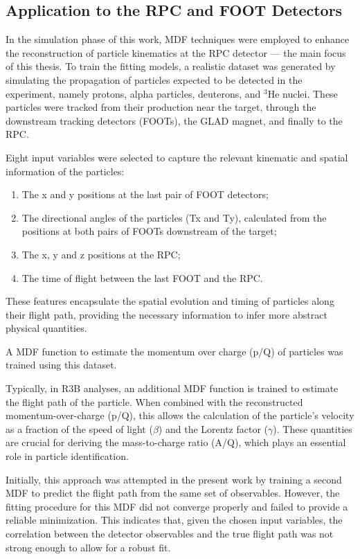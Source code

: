 \subsection{Application to the RPC and FOOT Detectors}

In the simulation phase of this work, \gls{MDF} techniques were employed to enhance the reconstruction of particle kinematics at the \gls{RPC} detector — the main focus of this thesis. To train the fitting models, a realistic dataset was generated by simulating the propagation of particles expected to be detected in the experiment, namely protons, alpha particles, deuterons, and $^3$He nuclei. These particles were tracked from their production near the target, through the downstream tracking detectors (FOOTs), the GLAD magnet, and finally to the \gls{RPC}.

Eight input variables were selected to capture the relevant kinematic and spatial information of the particles:
\begin{enumerate}
	\item The x and y positions at the last pair of FOOT detectors;
	\item The directional angles of the particles (Tx and Ty), calculated from the positions at both pairs of FOOTs downstream of the target;
	\item The x, y and z positions at the \gls{RPC};
	\item The time of flight between the last FOOT and the \gls{RPC}.
\end{enumerate}


These features encapsulate the spatial evolution and timing of particles along their flight path, providing the necessary information to infer more abstract physical quantities.

A \gls{MDF} function to estimate the momentum over charge (p/Q) of particles was trained using this dataset.

Typically, in \gls{R3B} analyses, an additional \gls{MDF} function is trained to estimate the flight path of the particle. When combined with the reconstructed momentum-over-charge (p/Q), this allows the calculation of the particle’s velocity as a fraction of the speed of light ($\beta$) and the Lorentz factor ($\gamma$). These quantities are crucial for deriving the mass-to-charge ratio (A/Q), which plays an essential role in particle identification.

Initially, this approach was attempted in the present work by training a second \gls{MDF} to predict the flight path from the same set of observables. However, the fitting procedure for this \gls{MDF} did not converge properly and failed to provide a reliable minimization. This indicates that, given the chosen input variables, the correlation between the detector observables and the true flight path was not strong enough to allow for a robust fit.

